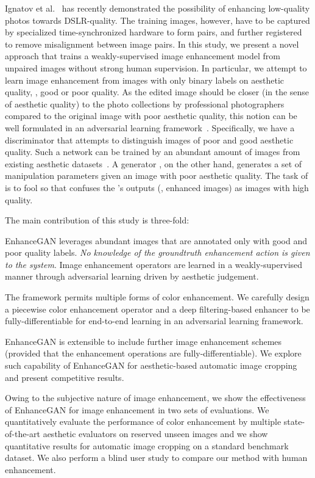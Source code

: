 \documentclass[sigconf]{acmart}
\newenvironment{packed_enumerate}{
    \begin{enumerate}
        \setlength{\itemsep}{1pt}
        \setlength{\parskip}{0pt}
        \setlength{\parsep}{0pt}
    }{\end{enumerate}}
\begin{document}
Ignatov et al.~\cite{ignatov2017dslr} has recently demonstrated the possibility of enhancing low-quality photos towards DSLR-quality. The training images, however, have to be captured by specialized time-synchronized hardware to form pairs, and further registered to remove misalignment between image pairs.
In this study, we present a novel approach that trains a weakly-supervised image enhancement model from unpaired images without strong human supervision.
In particular, we attempt to learn image enhancement from images with only binary labels on aesthetic quality, \ie, good or poor quality.
As the edited image should be closer (in the sense of aesthetic quality) to the photo collections by professional photographers compared to the original image with poor aesthetic quality, this notion can be well formulated in an adversarial learning framework~\cite{goodfellow2014generative}. 
Specifically, we have a discriminator  that attempts to distinguish images of poor and good aesthetic quality. Such a network can be trained by an abundant amount of images from existing aesthetic datasets~\cite{murray2012ava,tang2013content}. A generator , on the other hand,  generates a set of manipulation parameters given an image with poor aesthetic quality. The task of  is to fool  so that  confuses the 's outputs (\ie, enhanced images) as images with high quality.

\noindent The main contribution of this study is three-fold:
\begin{packed_enumerate}
  \item EnhanceGAN leverages abundant images that are annotated only with good and poor quality labels. \textit{No knowledge of the groundtruth enhancement action is given to the system}. Image enhancement operators are learned in a weakly-supervised manner through adversarial learning driven by aesthetic judgement.
  \item The framework permits multiple forms of color enhancement. We carefully design a piecewise color enhancement operator and a deep filtering-based enhancer to be fully-differentiable for end-to-end learning in an adversarial learning framework. 
  \item EnhanceGAN is extensible to include further image enhancement schemes (provided that the enhancement operations are fully-differentiable). We explore such capability of EnhanceGAN for aesthetic-based automatic image cropping and present competitive results. 
\end{packed_enumerate}
Owing to the subjective nature of image enhancement, we show the effectiveness of EnhanceGAN for image enhancement in two sets of evaluations. We quantitatively evaluate the performance of color enhancement by multiple state-of-the-art aesthetic evaluators on reserved unseen images and we show quantitative results for automatic image cropping on a standard benchmark dataset. We also perform a blind user study to compare our method with human enhancement. 
\end{document}
